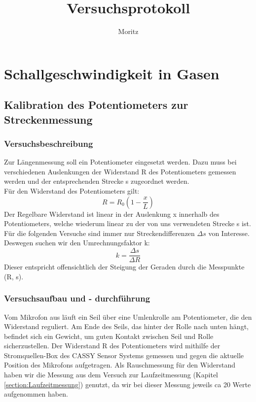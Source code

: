\documentclass[12pt,a4paper]{article}
\author{Moritz}
\begin{document}
	

\title{Versuchsprotokoll}
\tableofcontents
\newpage
\section{Schallgeschwindigkeit in Gasen}
\subsection{Kalibration des Potentiometers zur Streckenmessung}
\label{section:Kalibration_Poti}
\subsubsection{Versuchsbeschreibung}
Zur Längenmessung soll ein Potentiometer eingesetzt werden. Dazu muss bei verschiedenen Auslenkungen der Widerstand R des Potentiometers gemessen werden und der entsprechenden Strecke s zugeordnet werden.\\

Für den Widerstand des Potentiometers gilt:
\begin{equation}
R = R_0(1-\frac{x}{L})
\end{equation}
Der Regelbare Widerstand ist linear in der Auslenkung x innerhalb des Potentiometers, welche wiederum linear zu der von uns verwendeten Strecke s ist.\\

Für die folgenden Versuche sind immer nur Streckendifferenzen $\Delta s$ von Interesse. Deswegen suchen wir den Umrechnungsfaktor k:
\begin{equation}
k = \frac{\Delta s}{\Delta R}
\end{equation}
Dieser entspricht offensichtlich der Steigung der Geraden durch die Messpunkte (R, s).

\subsubsection{Versuchsaufbau und - durchführung}

Vom Mikrofon aus läuft ein Seil über eine Umlenkrolle am Potentiometer, die den Widerstand reguliert. Am Ende des Seils, das hinter der Rolle nach unten hängt, befindet sich ein Gewicht, um guten Kontakt zwischen Seil und Rolle sicherzustellen. Der Widerstand R des Potentiometers wird mithilfe der Stromquellen-Box des CASSY Sensor Systems gemessen und gegen die aktuelle Position des Mikrofons aufgetragen. Als Rauschmessung für den Widerstand haben wir die Messung aus dem Versuch zur Laufzeitmessung (Kapitel \ref{section:Laufzeitmessung}) genutzt, da wir bei dieser Messung jeweils ca 20 Werte aufgenommen haben.\\
\end{document}
